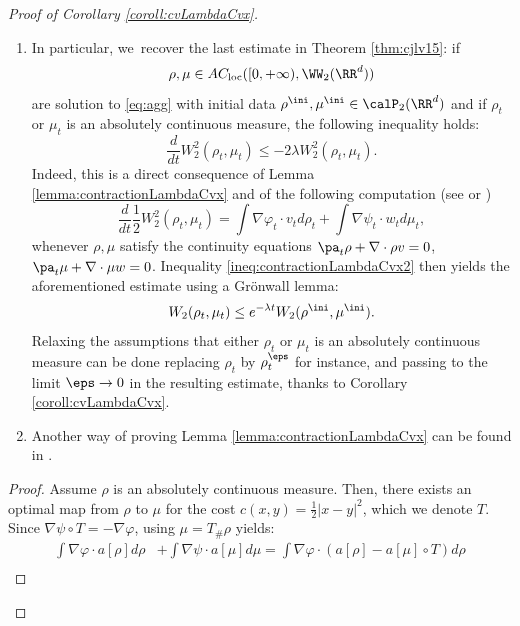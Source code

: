 \begin{proof}[Proof of Corollary \ref{coroll:cvLambdaCvx}]
\skpt
\begin{remark}
\begin{enumerate}
\item In particular, we~recover the last estimate in Theorem \ref{thm:cjlv15}: if
\[
\rho, \mu \in AC_\mathrm{loc}([0,+\infty), \WW _2(\RR^d))
\]
are solution to \eqref{eq:agg} with initial data $\rho^{\ini}, \mu^{\ini} \in \calP_2(\RR^d)$ and if $\rho_t$ or $\mu_t$ is an absolutely continuous measure, the following inequality holds:
\begin{equation}\label{ineq:contractionLambdaCvx2}
\frac{d}{dt} W_2^2(\rho_t, \mu_t) \leq -2\lambda W_2^2(\rho_t, \mu_t).
\end{equation}
Indeed, this is a direct consequence of Lemma \ref{lemma:contractionLambdaCvx} and of the following computation (see \cite[Th.\,5.25]{otam15} or \cite[Th.\,8.4.7]{ambrosio08})
\begin{equation}\label{eq:derW2}
\frac{d}{dt} \frac 12 W_2^2(\rho_t, \mu_t) = \int \nabla \varphi_t \cdot v_t d\rho_t + \int \nabla \psi_t \cdot w_t d\mu_t,
\end{equation}
whenever $\rho, \mu$ satisfy the continuity equations $\pa_t \rho + \nabla \cdot \rho v = 0$, $\pa_t \mu + \nabla \cdot \mu w = 0$. Inequality \eqref{ineq:contractionLambdaCvx2} then yields the aforementioned estimate using a Grönwall lemma:
\begin{equation}
W_2(\rho_t, \mu_t) \leq e^{-\lambda t} W_2(\rho^{\ini}, \mu^{\ini}).
\end{equation}
Relaxing the assumptions that either $\rho_t$ or $\mu_t$ is an absolutely continuous measure can be done replacing $\rho_t$ by $\rho^\eps_t$ for instance, and passing to the limit $\eps \to 0$ in the resulting estimate, thanks to Corollary \ref{coroll:cvLambdaCvx}.
\item Another way of proving Lemma \ref{lemma:contractionLambdaCvx} can be found in \cite[Lem.\,4.12]{santambrogio_bourbaki}.
\end{enumerate}
\end{remark}
\begin{proof}
Assume $\rho$ is an absolutely continuous measure. Then, there exists an optimal map from $\rho$ to $\mu$ for the cost $c(x,y) = \frac 12 |x-y|^2$, which we denote $T$. Since $\nabla \psi \circ T = - \nabla \varphi$, using $\mu = T_\# \rho$ yields:
\begin{align*}
\int \nabla \varphi \cdot a[\rho] d\rho & + \int \nabla \psi \cdot a[\mu] d\mu = \int \nabla \varphi \cdot (a[\rho] - a[\mu] \circ T) d\rho \\

\end{align*}
\end{proof}
\end{proof}

